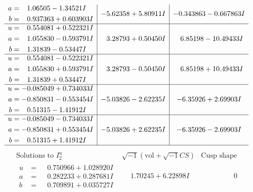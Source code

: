 \documentclass[1p]{elsarticle_modified}
\theoremstyle{definition}
\newcommand{\I}{\sqrt{-1}}
\begin{document}
$$\begin{array}{c|c|c}
\begin{aligned}
a &= \phantom{-}1.06505 - 1.34521 I \\
b &= \phantom{-}0.937363 + 0.603903 I\end{aligned}
 & -5.62358 + 5.80911 I & -0.343863 - 0.667863 I \\ \hline\begin{aligned}
u &= \phantom{-}0.554081 + 0.522321 I \\
a &= \phantom{-}1.055830 - 0.593791 I \\
b &= \phantom{-}1.31839 - 0.53447 I\end{aligned}
 & \phantom{-}3.28793 + 0.50450 I & \phantom{-}6.85198 - 10.49433 I \\ \hline\begin{aligned}
u &= \phantom{-}0.554081 - 0.522321 I \\
a &= \phantom{-}1.055830 + 0.593791 I \\
b &= \phantom{-}1.31839 + 0.53447 I\end{aligned}
 & \phantom{-}3.28793 - 0.50450 I & \phantom{-}6.85198 + 10.49433 I \\ \hline\begin{aligned}
u &= -0.085049 + 0.734033 I \\
a &= -0.850831 - 0.553454 I \\
b &= \phantom{-}0.51315 - 1.41912 I\end{aligned}
 & -5.03826 - 2.62235 I & -6.35926 + 2.69903 I \\ \hline\begin{aligned}
u &= -0.085049 - 0.734033 I \\
a &= -0.850831 + 0.553454 I \\
b &= \phantom{-}0.51315 + 1.41912 I\end{aligned}
 & -5.03826 + 2.62235 I & -6.35926 - 2.69903 I\\
 \hline 
 \end{array}$$\newpage$$\begin{array}{c|c|c}  
\text{Solutions to }I^u_{2}& \I (\text{vol} + \sqrt{-1}CS) & \text{Cusp shape}\\
 \hline 
\begin{aligned}
u &= \phantom{-}0.750966 + 1.028920 I \\
a &= \phantom{-}0.282233 + 0.287681 I \\
b &= \phantom{-}0.709891 + 0.035727 I\end{aligned}
 & \phantom{-}1.70245 + 6.22898 I & \phantom{-0.000000 } 0 \\ \hline\begin{aligned}

\end{aligned}
\end{array}$$
\end{document}
